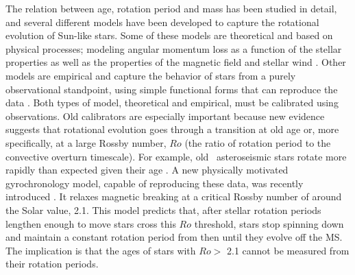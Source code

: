 The relation between age, rotation period and mass has been studied in detail,
and several different models have been developed to capture the rotational
evolution of Sun-like stars.
Some of these models are theoretical and based on physical processes; modeling
angular momentum loss as a function of the stellar properties as well as the
properties of the magnetic field and stellar wind \citep{kawaler1988,
kawaler1989, vansaders2013, matt2015, vansaders2016}.
Other models are empirical and capture the behavior of stars from a purely
observational standpoint, using simple functional forms that can reproduce the
data \citep{barnes2003, barnes2007, mamajek2008, angus2015}.
Both types of model, theoretical and empirical, must be calibrated using
observations.
Old calibrators are especially important because new evidence suggests that
rotational evolution goes through a transition at old age or, more
specifically, at a large Rossby number, $Ro$ (the ratio of rotation period to
the convective overturn timescale).
For example, old \kepler\ asteroseismic stars rotate more rapidly than
expected given their age \citep[\eg][]{angus2015, vansaders2016}.
A new physically motivated gyrochronology model, capable of reproducing these
data, was recently introduced \citep{vansaders2016}.
It relaxes magnetic breaking at a critical Rossby number of around the Solar
value, 2.1.
This model predicts that, after stellar rotation periods lengthen enough to
move stars cross this $Ro$ threshold, stars stop spinning down and maintain a
constant rotation period from then until they evolve off the MS.
The implication is that the ages of stars with $Ro >$ 2.1 cannot be measured
from their rotation periods.

